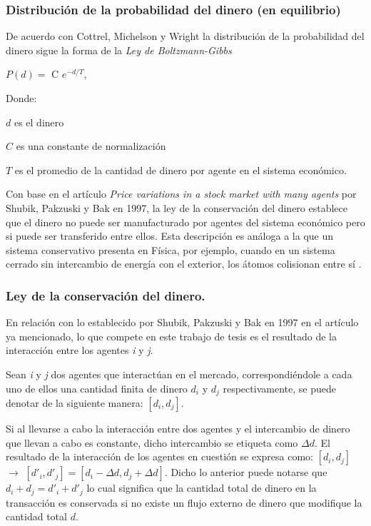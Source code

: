 \subsubsection{Distribución de la probabilidad del dinero (en equilibrio)}


De acuerdo con Cottrel, Michelson y Wright \citep[][]{cottrell_classical_2009} la distribución de la probabilidad del dinero sigue la forma de la \textit{Ley de Boltzmann-Gibbs}


\begin{center}
$\mathit{P(d)} = $ C $e^{-d/\mathit{T}}$,
\end{center}
Donde:

$d$ es el dinero

$C$ es una constante de normalización

$\mathit{T}$ es el promedio de la cantidad de dinero por agente en el sistema económico.

Con base en el artículo \textit{Price variations in a stock market with many agents} por Shubik, Pakzuski y Bak en 1997, la ley de la conservación del dinero establece que el dinero no puede ser manufacturado por agentes del sistema económico pero si puede ser transferido entre ellos. Esta descripción es análoga a la que un sistema conservativo presenta en Física, por ejemplo, cuando en un sistema cerrado sin intercambio de energía con el exterior, los átomos colisionan entre sí \citep[][]{shubik}. 
\newpage

\subsubsection{Ley de la conservación del dinero.} 

En relación con lo establecido por Shubik, Pakzuski y Bak en 1997 en el artículo ya mencionado, lo que compete en este trabajo de tesis es el resultado de la interacción entre los agentes \textit{i} y \textit{j}. 

Sean \textit{i} y \textit{j} dos agentes que interactúan en el mercado, correspondiéndole a cada uno de ellos una cantidad finita de dinero $d_{i}$ y $d_{j}$ respectivamente, se puede denotar de la siguiente manera: $[d_{i},d_{j}]$. 

Si al llevarse a cabo la interacción entre dos agentes y el intercambio de dinero que llevan a cabo es constante, dicho intercambio se etiqueta como $\Delta d$. El resultado de la interacción de los agentes en cuestión se expresa como:  $[d_{i},d_{j}]$ $\longrightarrow$  $[d'_{i},d'_{j}] = [d_{i} - \Delta d ,d_{j} + \Delta d]$. Dicho lo anterior puede notarse que $d_{i} + d_{j} = d'_{i} + d'_{j}$ lo cual significa que la cantidad total de dinero en la transacción es conservada si no existe un flujo externo de dinero que modifique la cantidad total $d$.

